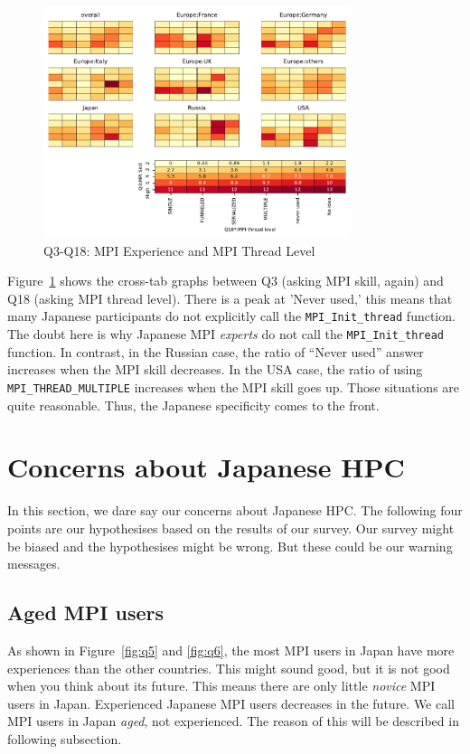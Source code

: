 \documentclass[submit,techrep,noauthor,english]{ipsj}
\begin{document}
\begin{figure}[htb]
\begin{center}
\includegraphics[width=9cm]{../pdfs/Q3-Q18.pdf}
\caption{Q3-Q18: MPI Experience and MPI Thread Level}
\label{fig:q3-q18}
\end{center}
\end{figure}

Figure~\ref{fig:q3-q18} shows the cross-tab graphs between
Q3 (asking MPI skill, again) and Q18 (asking MPI thread
level). There is a peak at 'Never used,' this means that many Japanese
participants do not explicitly call the {\tt MPI\_Init\_thread}
function.  The doubt here is why Japanese MPI {\em experts} do not
call the {\tt MPI\_Init\_thread} function. 
In contrast, in the Russian case, the ratio of ``Never used'' answer
increases when the  MPI skill decreases. In the USA case, the ratio of
using {\tt MPI\_THREAD\_MULTIPLE} increases when the MPI skill goes
up. Those situations are quite reasonable. Thus, the Japanese
specificity comes to the front. 

\section{Concerns about Japanese HPC}

In this section, we dare say our concerns about Japanese HPC. The
following four points are our hypothesises based on the results of our 
survey. Our survey might be biased and the hypothesises might be
wrong. But these could be our warning messages. 

\subsection{Aged MPI users}

As shown in Figure~\ref{fig:q5} and \ref{fig:q6}, the most MPI users
in Japan have more experiences than the other countries. This might
sound good, but it is not good when you think about its future.  This
means there are only little {\em novice} MPI users in Japan.
Experienced Japanese MPI users decreases in the future.  We
call MPI users in Japan {\em aged}, not experienced. The reason of
this will be described in following subsection.
\end{document}
